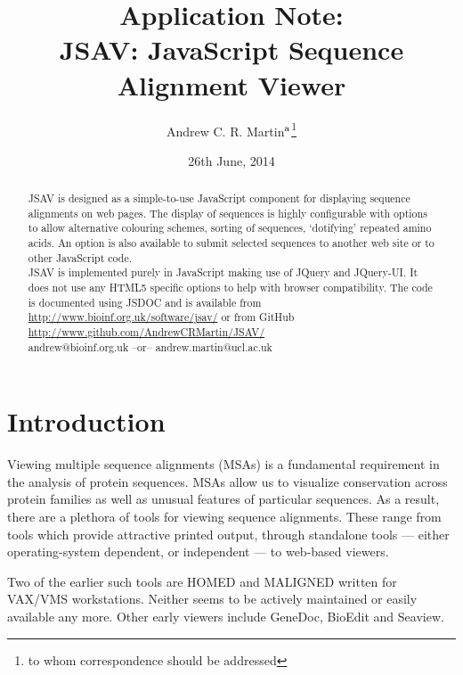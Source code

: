 \documentclass[a4]{bioinfo}
\title[JSAV: JavaScript Sequence Alignment Viewer]{Application Note:\\
JSAV: JavaScript Sequence Alignment Viewer}
\date{26th June, 2014}
\author[Martin]{Andrew C. R. Martin\mbox{${}^{\rm a}$}\footnote{to whom
    correspondence should be addressed}}
\begin{document}
\maketitle

\begin{abstract}
 JSAV is designed as a simple-to-use
JavaScript component for displaying sequence alignments on web pages.
The display of sequences is highly configurable with options to allow
alternative colouring schemes, sorting of sequences, `dotifying'
repeated amino acids. An option is also available to submit selected
sequences to another web site or to other JavaScript code.  \\
JSAV is implemented purely in JavaScript making use of JQuery and
JQuery-UI. It does not use any HTML5 specific options to help with
browser compatibility. The code is documented using JSDOC
and is available from \url{http://www.bioinf.org.uk/software/jsav/} or
from GitHub \url{http://www.github.com/AndrewCRMartin/JSAV/}\\
 andrew@bioinf.org.uk --or--
andrew.martin@ucl.ac.uk
\end{abstract}


\section{Introduction}
Viewing multiple sequence alignments (MSAs) is a fundamental
requirement in the analysis of protein sequences. MSAs allow us to
visualize conservation across protein families as well as unusual
features of particular sequences. As a result, there are a plethora of
tools for viewing sequence alignments. These range from tools which
provide attractive printed output, through standalone tools --- either
operating-system dependent, or independent --- to web-based viewers.

Two of the earlier such tools are HOMED\cite{stockwell:homed} and
MALIGNED\cite{clark:maligned} written for VAX/VMS workstations.
Neither seems to be actively maintained or easily available any
more. Other early viewers include GeneDoc\cite{nicholas:genedoc},
BioEdit and Seaview\cite{galtier:seavier}.
\end{document}
